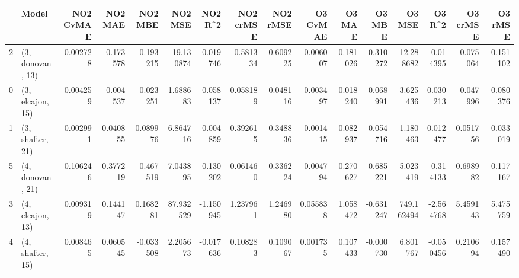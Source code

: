\begin{tabular}{llrrrrrrrrrrrrrr}
\toprule
{} &             Model &  NO2 CvMAE &   NO2 MAE &   NO2 MBE &    NO2 MSE &   NO2 R\textasciicircum2 &  NO2 crMSE &  NO2 rMSE &  O3 CvMAE &    O3 MAE &    O3 MBE &      O3 MSE &    O3 R\textasciicircum2 &  O3 crMSE &   O3 rMSE \\
\midrule
2 &  (3, donovan, 13) &  -0.002728 & -0.173578 & -0.193215 & -19.130874 & -0.019746 &  -0.581334 & -0.609225 & -0.006007 & -0.181026 &  0.310272 &  -12.288682 & -0.014395 & -0.075064 & -0.151102 \\
0 &  (3, elcajon, 15) &   0.004259 & -0.004537 & -0.023251 &   1.688683 & -0.058137 &   0.058189 &  0.048116 & -0.003497 & -0.018240 &  0.068991 &   -3.625436 &  0.030213 & -0.047996 & -0.080376 \\
1 &  (3, shafter, 21) &   0.002991 &  0.040855 &  0.089976 &   6.864716 & -0.004859 &   0.392615 &  0.348836 & -0.001415 &  0.082937 & -0.054716 &    1.180463 &  0.012477 &  0.051756 &  0.033019 \\
5 &  (4, donovan, 21) &   0.106246 &  0.377219 & -0.467519 &   7.043895 & -0.130202 &   0.061460 &  0.336224 & -0.004794 &  0.270627 & -0.685221 &   -5.023419 & -0.314133 &  0.698982 & -0.117167 \\
3 &  (4, elcajon, 13) &   0.009319 &  0.144147 &  0.168281 &  87.932529 & -1.150945 &   1.237961 &  1.246980 &  0.055838 &  1.058472 & -0.631247 &  749.162494 & -2.564768 &  5.459143 &  5.475759 \\
4 &  (4, shafter, 15) &   0.008465 &  0.060545 & -0.033508 &   2.205673 & -0.017636 &   0.108283 &  0.109067 &  0.001735 &  0.107433 & -0.000730 &    6.801767 & -0.050456 &  0.210694 &  0.157490 \\
\bottomrule
\end{tabular}
